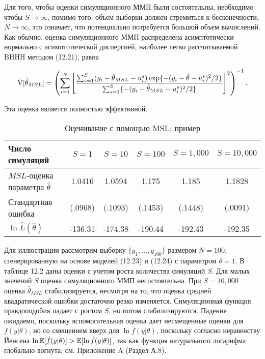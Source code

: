 Для того, чтобы оценки симуляционного ММП были состоятельны, необходимо чтобы $S \rightarrow \infty$, помимо того, объем выборки должен стремиться к бесконечности, $N \rightarrow \infty$, это означает, что потенциально потребуется большой объем вычислений. Как обычно, оценка симуляционного ММП распределена асимптотически нормально с асимптотической дисперсией, наиболее легко рассчитываемой BHHH методом (12.21), равна 

\begin{equation}
\hat{\mathrm{V}}[\hat{\theta}_{MSL}]=\left(\sum^{N}_{i=1}\left[\dfrac{\sum^{S}_{s=1}(y_i-\hat{\theta}_{MSL}-u^{s}_i)\exp\lbrace{-(y_i-\hat{\theta}-u^{s}_i)^{2}/2} \rbrace} {\sum^{S}_{s=1}\lbrace{-(y_i-\hat{\theta}_{MSL}-u^{s}_i)^{2}/2} \rbrace} \right]^{2}  \right)^{-1}.
\end{equation}

Эта оценка является полностью эффективной.

\begin{table}[h]
\begin{center}
\caption{\label{tab:mslexample} Оценивание с помощью MSL: пример}
\begin{tabular}{lccccc}
\hline 
\hline
{\bf{Число симуляций}} & $S = 1$ & $S = 10$ & $S = 100$ & $S = 1,000$ & $S = 10,000$ \\ 
\hline
$MSL$-оценка параметра $\hat{\theta}$ & 1.0416 & 1.0594 & 1.175 & 1.185 & 1.1828 \\ 
Стандартная ошибка & (.0968) & (.1093) & (.1453) & (.1448) & (.0091) \\ 
$\ln\hat{L}(\hat{\theta})$ & -136.31 & -174.38 & -190.44 & -192.43 & -192.35 \\ 
\hline 
\hline
\end{tabular} 
\end{center}
\end{table}

Для иллюстрации рассмотрим выборку $\lbrace{y_1,\ldots ,y_{100}}\rbrace$ размером $N=100$, сгенерированную на основе моделей (12.23) и (12.24) с параметром $\theta=1$. В таблице 12.2 даны оценки с учетом роста количества симуляций $S$. Для малых значений $S$  оценка симуляционного ММП несостоятельна. При $S=10,000$  оценка $\hat{\theta}_{MSL}$ стабилизируется, несмотря на то, что оценка средней квадратической ошибки достаточно резко изменяется. Симуляционная функция правдоподобия падает с ростом $S$, но потом стабилизируются.     Падение ожидаемо, поскольку вспомогательная оценка дает несмещенные оценки для $f(y|\theta)$, но со смещением вверх для $\ln{f(y|\theta)}$, поскольку согласно неравенству Йенсена $\ln{\mathbb{E}[\hat{f}(y|\theta)]}>\mathbb{E}[\ln{\hat{f}(y|\theta)}]$, так как функция натурального логарифма глобально вогнута; см. Приложение A (Раздел А.8).

